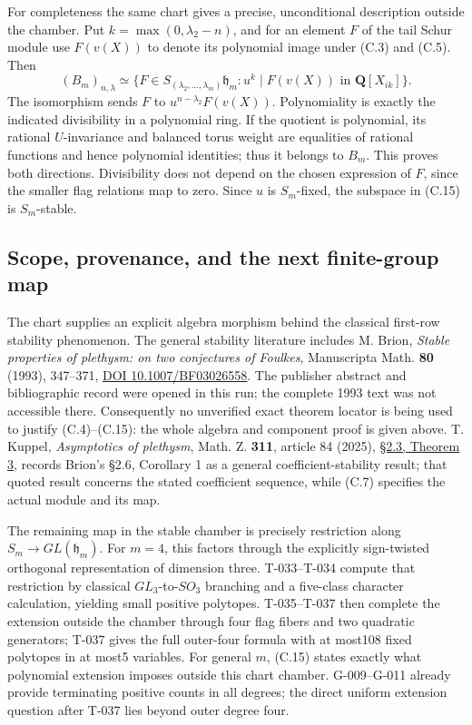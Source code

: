 \documentclass[
  10pt,
]{article}
\begin{document}
For completeness the same chart gives a precise, unconditional
description outside the chamber. Put \(k=\max(0,\lambda_2-n)\), and for
an element \(F\) of the tail Schur module use \(F(v(X))\) to denote its
polynomial image under (C.3) and (C.5). Then \[
\boxed{
(B_m)_{n,\lambda}\simeq
\{F\in S_{(\lambda_2,\ldots,\lambda_m)}\mathfrak h_m:
u^k\mid F(v(X))\text{ in }\mathbf Q[X_{ik}]\}.}
\tag{C.15}
\] The isomorphism sends \(F\) to \(u^{n-\lambda_2}F(v(X))\).
Polynomiality is exactly the indicated divisibility in a polynomial
ring. If the quotient is polynomial, its rational \(U\)-invariance and
balanced torus weight are equalities of rational functions and hence
polynomial identities; thus it belongs to \(B_m\). This proves both
directions. Divisibility does not depend on the chosen expression of
\(F\), since the smaller flag relations map to zero. Since \(u\) is
\(S_m\)-fixed, the subspace in (C.15) is \(S_m\)-stable.

\subsection{Scope, provenance, and the next finite-group
map}\label{scope-provenance-and-the-next-finite-group-map}

The chart supplies an explicit algebra morphism behind the classical
first-row stability phenomenon. The general stability literature
includes M. Brion, \emph{Stable properties of plethysm: on two
conjectures of Foulkes}, Manuscripta Math. \textbf{80} (1993), 347--371,
\href{https://doi.org/10.1007/BF03026558}{DOI 10.1007/BF03026558}. The
publisher abstract and bibliographic record were opened in this run; the
complete 1993 text was not accessible there. Consequently no unverified
exact theorem locator is being used to justify (C.4)--(C.15): the whole
algebra and component proof is given above. T. Kuppel, \emph{Asymptotics
of plethysm}, Math. Z. \textbf{311}, article 84 (2025),
\href{https://link.springer.com/article/10.1007/s00209-025-03879-4}{§2.3,
Theorem 3}, records Brion's §2.6, Corollary 1 as a general
coefficient-stability result; that quoted result concerns the stated
coefficient sequence, while (C.7) specifies the actual module and its
map.

The remaining map in the stable chamber is precisely restriction along
\(S_m\to GL(\mathfrak h_m)\). For \(m=4\), this factors through the
explicitly sign-twisted orthogonal representation of dimension three.
T-033--T-034 compute that restriction by classical \(GL_3\)-to-\(SO_3\)
branching and a five-class character calculation, yielding small
positive polytopes. T-035--T-037 then complete the extension outside the
chamber through four flag fibers and two quadratic generators; T-037
gives the full outer-four formula with at most108 fixed polytopes in at
most5 variables. For general \(m\), (C.15) states exactly what
polynomial extension imposes outside this chart chamber. G-009--G-011
already provide terminating positive counts in all degrees; the direct
uniform extension question after T-037 lies beyond outer degree four.
\end{document}
